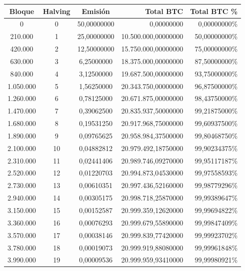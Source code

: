 \documentclass[12pt,a4paper,twoside]{book}
\begin{document}
\begin{footnotesize}
\begin{longtable}{|c|c|c|r|r|}
\hline
\textbf{Bloque} & \textbf{Halving} & \textbf{Emisión} & {\centering \textbf{Total BTC}} & {\centering \textbf{Total BTC \%}} \\ \hline
0 & 0 & 50,00000000 & 0,00000000 & 0,00000000\% \\ \hline
210.000 & 1 & 25,00000000 & 10.500.000,00000000 & 50,00000000\% \\ \hline
420.000 & 2 & 12,50000000 & 15.750.000,00000000 & 75,00000000\% \\ \hline
630.000 & 3 & 6,25000000 & 18.375.000,00000000 & 87,50000000\% \\ \hline
840.000 & 4 & 3,12500000 & 19.687.500,00000000 & 93,75000000\% \\ \hline
1.050.000 & 5 & 1,56250000 & 20.343.750,00000000 & 96,87500000\% \\ \hline
1.260.000 & 6 & 0,78125000 & 20.671.875,00000000 & 98,43750000\% \\ \hline
1.470.000 & 7 & 0,39062500 & 20.835.937,50000000 & 99,21875000\% \\ \hline
1.680.000 & 8 & 0,19531250 & 20.917.968,75000000 & 99,60937500\% \\ \hline
1.890.000 & 9 & 0,09765625 & 20.958.984,37500000 & 99,80468750\% \\ \hline
2.100.000 & 10 & 0,04882812 & 20.979.492,18750000 & 99,90234375\% \\ \hline
2.310.000 & 11 & 0,02441406 & 20.989.746,09270000 & 99,95117187\% \\ \hline
2.520.000 & 12 & 0,01220703 & 20.994.873,04530000 & 99,97558593\% \\ \hline
2.730.000 & 13 & 0,00610351 & 20.997.436,52160000 & 99,98779296\% \\ \hline
2.940.000 & 14 & 0,00305175 & 20.998.718,25870000 & 99,99389647\% \\ \hline
3.150.000 & 15 & 0,00152587 & 20.999.359,12620000 & 99,99694822\% \\ \hline
3.360.000 & 16 & 0,00076293 & 20.999.679,55890000 & 99,99847409\% \\ \hline
3.570.000 & 17 & 0,00038146 & 20.999.839,77420000 & 99,99923702\% \\ \hline
3.780.000 & 18 & 0,00019073 & 20.999.919,88080000 & 99,99961848\% \\ \hline
3.990.000 & 19 & 0,00009536 & 20.999.959,93410000 & 99,99980921\% \\ \hline

\end{longtable}
\end{footnotesize}
\end{document}
